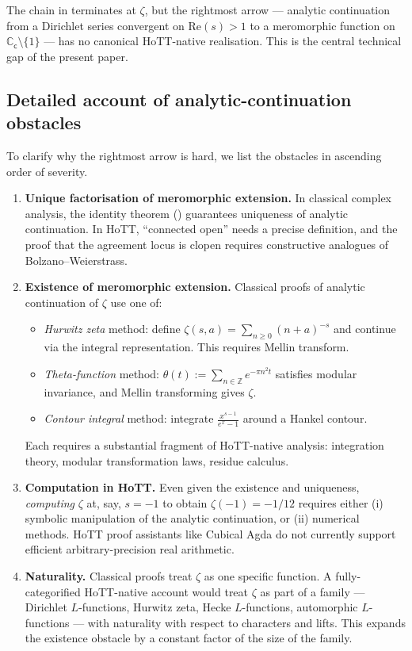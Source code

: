 \documentclass[12pt]{article}
\theoremstyle{definition}
\theoremstyle{remark}
\newcommand{\C}{\mathbb{C}}
\newcommand{\Z}{\mathbb{Z}}
\newcommand{\Cc}{\C_{\mathsf{c}}}
\begin{document}
The chain in  terminates at $\zeta$, but the rightmost arrow
— analytic continuation from a Dirichlet series convergent on $\mathrm{Re}(s)>1$
to a meromorphic function on $\Cc \setminus \{1\}$ — has no canonical
HoTT-native realisation. This is the central technical gap of the present
paper.

\subsection{Detailed account of analytic-continuation obstacles}\label{subsec:obstacles}

To clarify why the rightmost arrow is hard, we list the obstacles in
ascending order of severity.

\begin{enumerate}
\item \textbf{Unique factorisation of meromorphic extension.}
In classical complex analysis, the identity theorem ()
guarantees uniqueness of analytic continuation. In HoTT, ``connected open''
needs a precise definition, and the proof that the agreement locus is
clopen requires constructive analogues of Bolzano--Weierstrass.

\item \textbf{Existence of meromorphic extension.}
Classical proofs of analytic continuation of $\zeta$ use one of:
\begin{itemize}
\item \emph{Hurwitz zeta} method: define $\zeta(s,a) = \sum_{n \geq 0}(n+a)^{-s}$
and continue via the integral representation. This requires Mellin transform.
\item \emph{Theta-function} method: $\theta(t) := \sum_{n \in \Z} e^{-\pi n^2 t}$
satisfies modular invariance, and Mellin transforming gives $\zeta$.
\item \emph{Contour integral} method: integrate $\frac{x^{s-1}}{e^x - 1}$
around a Hankel contour.
\end{itemize}
Each requires a substantial fragment of HoTT-native analysis: integration
theory, modular transformation laws, residue calculus.

\item \textbf{Computation in HoTT.}
Even given the existence and uniqueness, \emph{computing} $\zeta$ at, say,
$s = -1$ to obtain $\zeta(-1) = -1/12$ requires either (i) symbolic
manipulation of the analytic continuation, or (ii) numerical methods. HoTT
proof assistants like Cubical Agda do not currently support efficient
arbitrary-precision real arithmetic.

\item \textbf{Naturality.}
Classical proofs treat $\zeta$ as one specific function. A fully-categorified
HoTT-native account would treat $\zeta$ as part of a family — Dirichlet
$L$-functions, Hurwitz zeta, Hecke $L$-functions, automorphic
$L$-functions — with naturality with respect to characters and lifts. This
expands the existence obstacle by a constant factor of the size of the family.
\end{enumerate}
\end{document}
